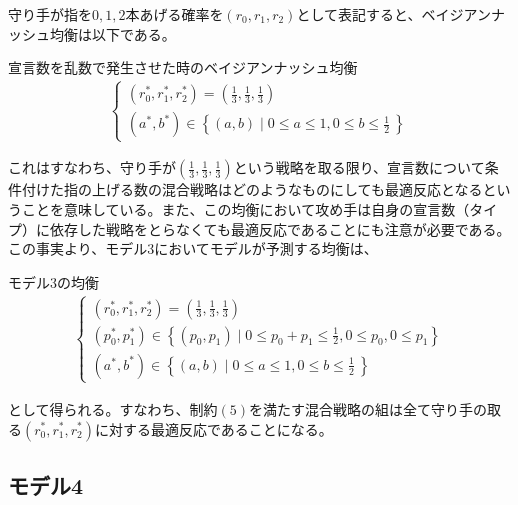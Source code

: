 \documentclass{jsarticle}
\begin{document}
守り手が指を$0,1,2$本あげる確率を$(r_0, r_1, r_2)$として表記すると、ベイジアンナッシュ均衡は以下である。
\begin{itembox}[l]{宣言数を乱数で発生させた時のベイジアンナッシュ均衡}
\begin{align}
\begin{cases}(r_0^*, r_1^*, r_2^*) = (\frac{1}{3}, \frac{1}{3}, \frac{1}{3}) \\[7pt]
(a^*, b^*) \in \left\{ (a,b) \mid 0 \leq a \leq 1, 0 \leq b \leq \frac{1}{2}\ \right\}
\end{cases}
\end{align}
\end{itembox}
これはすなわち、守り手が$(\frac{1}{3}, \frac{1}{3}, \frac{1}{3})$という戦略を取る限り、宣言数について条件付けた指の上げる数の混合戦略はどのようなものにしても最適反応となるということを意味している。また、この均衡において攻め手は自身の宣言数（タイプ）に依存した戦略をとらなくても最適反応であることにも注意が必要である。この事実より、モデル3においてモデルが予測する均衡は、
\begin{itembox}[l]{モデル3の均衡}
\begin{align}
\begin{cases}(r_0^*, r_1^*, r_2^*) = (\frac{1}{3}, \frac{1}{3}, \frac{1}{3}) \\[7pt]
(p_0^*, p_1^*) \in \left\{ (p_0, p_1) \mid 0 \leq p_0 + p_1 \leq \frac{1}{2}, 0 \leq p_0, 0 \leq p_1 \right\}\\[7pt]
(a^*, b^*) \in \left\{ (a,b) \mid 0 \leq a \leq 1, 0 \leq b \leq \frac{1}{2}\ \right\}
\end{cases}
\end{align}
\end{itembox}
として得られる。すなわち、制約$(5)$を満たす混合戦略の組は全て守り手の取る$(r_0^*, r_1^*, r_2^*)$に対する最適反応であることになる。


\subsection{モデル4}
\end{document}

